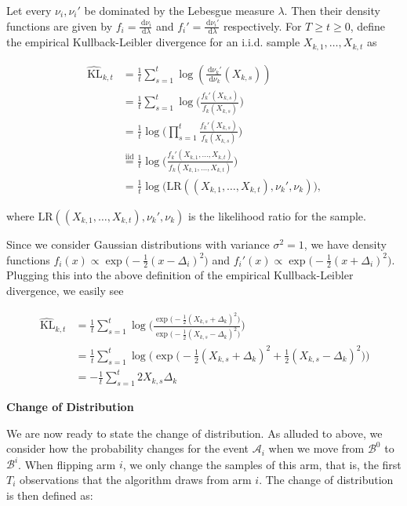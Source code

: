\documentclass[11pt,]{article}
\newcommand{\KL}{\,\text{KL}}
\newcommand{\der}{\,\text{d}}
\begin{document}
Let every \(\nu_i, \nu_i'\) be dominated by the Lebesgue measure
\(\lambda\). Then their density functions are given by
\(f_i = \frac{\der \nu_i}{\der \lambda}\) and
\(f_i' = \frac{\der \nu_i'}{\der \lambda}\) respectively. For
\(T \geq t \geq 0\), define the empirical Kullback-Leibler divergence
for an i.i.d. sample \(X_{k,1}, \dots,X_{k,t}\) as

\begin{align*}
\hat{\KL}_{k,t} & = \frac{1}{t} \sum_{s=1}^{t} \log(\frac{\der \nu_k'}{\der \nu_k}(X_{k,s})) \\
& = \frac{1}{t} \sum_{s=1}^{t} \log \big(\frac{f_k'(X_{k,s})}{f_k(X_{k,s})} \big) \\
& = \frac{1}{t} \log \big( \prod_{s=1}^{t} \frac{f_k'(X_{k,s})}{f_k(X_{k,s})} \big) \\
& \stackrel{\text{iid}}{=} \frac{1}{t} \log \big( \frac{f_k'(X_{k,1}, \dots,X_{k,t})}{f_k(X_{k,1}, \dots,X_{k,t})} \big) \\
& = \frac{1}{t} \log \big( \text{LR}((X_{k,1}, \dots,X_{k,t}), \nu_k', \nu_k) \big),
\end{align*}

where \(\text{LR}((X_{k,1}, \dots,X_{k,t}), \nu_k', \nu_k)\) is the
likelihood ratio for the sample.

Since we consider Gaussian distributions with variance \(\sigma^2 = 1\),
we have density functions
\(f_i(x) \propto \exp \big(-\frac{1}{2} (x-\Delta_i)^2\big)\) and
\(f_i'(x) \propto \exp \big(-\frac{1}{2} (x+\Delta_i)^2\big)\). Plugging
this into the above definition of the empirical Kullback-Leibler
divergence, we easily see

\begin{align*}
\hat{\KL}_{k,t} & = \frac{1}{t} \sum_{s=1}^{t} \log \Big(\frac{\exp \big(-\frac{1}{2} (X_{k,s}+\Delta_k)^2\big)}{\exp \big(-\frac{1}{2} (X_{k,s}-\Delta_k)^2\big)} \Big) \\
& = \frac{1}{t} \sum_{s=1}^{t} \log \Big( \exp \big(-\frac{1}{2} (X_{k,s}+\Delta_k)^2 + \frac{1}{2} (X_{k,s}-\Delta_k)^2 \big) \Big) \\
& = - \frac{1}{t} \sum_{s=1}^{t} 2 X_{k,s} \Delta_k
\end{align*}

\textbf{Change of Distribution}

We are now ready to state the change of distribution. As alluded to
above, we consider how the probability changes for the event
\(\mathcal{A}_i\) when we move from \(\mathcal{B}^0\) to
\(\mathcal{B}^i\). When flipping arm \(i\), we only change the samples
of this arm, that is, the first \(T_i\) observations that the algorithm
draws from arm \(i\). The change of distribution is then defined as:
\end{document}
